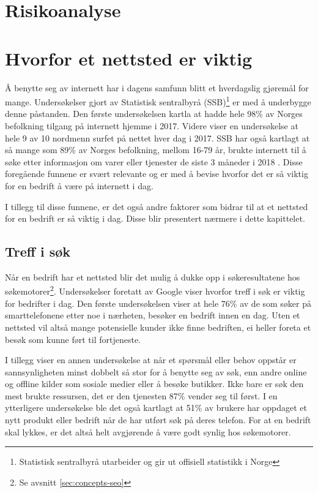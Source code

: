 \section{Risikoanalyse}

\section{Hvorfor et nettsted er viktig}
Å benytte seg av internett har i dagens samfunn blitt et hverdagslig gjøremål for mange. Undersøkelser gjort av Statistisk sentralbyrå (SSB)\footnote{Statistisk sentralbyrå utarbeider og gir ut offisiell statistikk i Norge} er med å underbygge denne påstanden. Den første undersøkelsen \cite{ssb17fim} kartla at hadde hele 98\% av Norges befolkning tilgang på internett hjemme i 2017. Videre viser en undersøkelse \cite{ssb17nat} at hele 9 av 10 nordmenn surfet på nettet hver dag i 2017. SSB har også kartlagt  at så mange som 89\% av Norges befolkning, mellom 16-79 år, brukte internett til å søke etter informasjon om varer eller tjenester de siste 3 måneder i 2018 \cite{ssb18aup}. Disse foregående funnene er svært relevante og er med å bevise hvorfor det er så viktig for en bedrift å være på internett i dag.

I tillegg til disse funnene, er det også andre faktorer som bidrar til at et nettsted for en bedrift er så viktig i dag. Disse blir presentert nærmere i dette kapittelet. 

\subsection{Treff i søk}
\label{sec:search-results}
Når en bedrift har et nettsted blir det mulig å dukke opp i søkeresultatene hos søkemotorer\footnote{Se avsnitt \ref{sec:concepts-seo}}. Undersøkelser foretatt av Google viser hvorfor treff i søk er viktig for bedrifter i dag. Den første undersøkelsen \cite{google16hms} viser at hele 76\% av de som søker på smarttelefonene etter noe i nærheten, besøker en bedrift innen en dag. Uten et nettsted vil altså mange potensielle kunder ikke finne bedriften, ei heller foreta et besøk som kunne ført til fortjeneste. 

I tillegg viser en annen undersøkelse \cite{google16mhc} at når et spørsmål eller behov oppstår er sannsynligheten minst dobbelt så stor for å benytte seg av søk, enn andre online og offline kilder som sosiale medier eller å besøke butikker. Ikke bare er søk den mest brukte ressursen, det er den tjenesten 87\% vender seg til først. I en ytterligere undersøkelse  \cite{google16scp} ble det også kartlagt at 51\% av brukere har oppdaget et nytt produkt eller bedrift når de har utført søk på deres telefon. For at en bedrift skal lykkes, er det altså helt avgjørende å være godt synlig hos søkemotorer.



